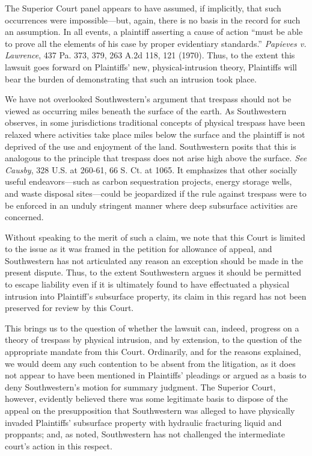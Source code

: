 The Superior Court panel appears to have assumed, if implicitly, that such
occurrences were impossible---but, again, there is no basis in the record for
such an assumption. In all events, a plaintiff asserting a cause of action
``must be able to prove all the elements of his case by proper evidentiary
standards.'' \textit{Papieves v. Lawrence}, 437 Pa. 373, 379, 263 A.2d 118, 121
(1970). Thus, to the extent this lawsuit goes forward on Plaintiffs' new,
physical-intrusion theory, Plaintiffs will bear the burden of demonstrating that
such an intrusion took place.

We have not overlooked Southwestern's argument that trespass should not be
viewed as occurring miles beneath the surface of the earth. As Southwestern
observes, in some jurisdictions traditional concepts of physical trespass have
been relaxed where activities take place miles below the surface and the
plaintiff is not deprived of the use and enjoyment of the land. Southwestern
posits that this is analogous to the principle that trespass does not arise high
above the surface. \textit{See} \textit{Causby}, 328 U.S. at 260-61, 66 S. Ct.
at 1065. It emphasizes that other socially useful endeavors---such as carbon
sequestration projects, energy storage wells, and waste disposal sites---could
be jeopardized if the rule against trespass were to be enforced in an unduly
stringent manner where deep subsurface activities are concerned. 


Without speaking to the merit of such a claim, we note that this Court is
limited to the issue as it was framed in the petition for allowance of appeal,
and Southwestern has not articulated any reason an exception should be made in
the present dispute. Thus, to the extent Southwestern argues it should be
permitted to escape liability even if it is ultimately found to have effectuated
a physical intrusion into Plaintiff's subsurface property, its claim in this
regard has not been preserved for review by this Court.


This brings us to the question of whether the lawsuit can, indeed, progress on a
theory of trespass by physical intrusion, and by extension, to the question of
the appropriate mandate from this Court. Ordinarily, and for the reasons
explained, we would deem any such contention to be absent from the litigation,
as it does not appear to have been mentioned in Plaintiffs' pleadings or argued
as a basis to deny Southwestern's motion for summary judgment. The Superior
Court, however, evidently believed there was some legitimate basis to dispose of
the appeal on the presupposition that Southwestern was alleged to have
physically invaded Plaintiffs' subsurface property with hydraulic fracturing
liquid and proppants; and, as noted, Southwestern has not challenged the
intermediate court's action in this respect. 


